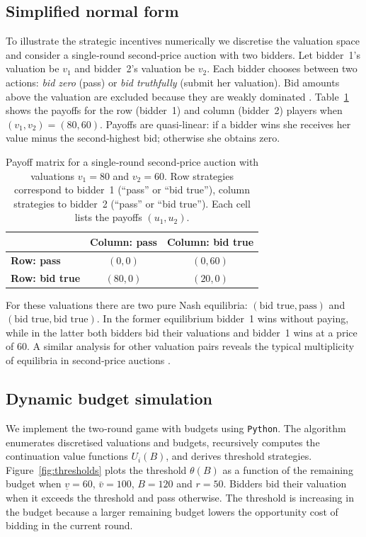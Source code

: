 \subsection{Simplified normal form}
To illustrate the strategic incentives numerically we discretise the valuation space and consider a single‑round second‑price auction with two bidders.  Let bidder~1’s valuation be \(v_1\) and bidder~2’s valuation be \(v_2\).  Each bidder chooses between two actions: \emph{bid zero} (pass) or \emph{bid truthfully} (submit her valuation).  Bid amounts above the valuation are excluded because they are weakly dominated \parencite{SpirakisAuctionsSlides}.  Table~\ref{tab:payoffmatrix} shows the payoffs for the row (bidder~1) and column (bidder~2) players when \((v_1,v_2)=(80,60)\).  Payoffs are quasi‑linear: if a bidder wins she receives her value minus the second‑highest bid; otherwise she obtains zero.

\begin{table}[H]
    \centering
    \caption{Payoff matrix for a single‑round second‑price auction with valuations \(v_1=80\) and \(v_2=60\).  Row strategies correspond to bidder~1 (“pass” or “bid true”), column strategies to bidder~2 (“pass” or “bid true”).  Each cell lists the payoffs \((u_1,u_2)\).}
    \label{tab:payoffmatrix}
    \begin{tabular}{lcc}
        \toprule
        & \textbf{Column: pass} & \textbf{Column: bid true}\\
        \midrule
        \textbf{Row: pass} & \((0,0)\) & \((0,60)\)\\
        \textbf{Row: bid true} & \((80,0)\) & \((20,0)\)\\
        \bottomrule
    \end{tabular}
\end{table}

For these valuations there are two pure Nash equilibria: \((\text{bid true},\text{pass})\) and \((\text{bid true},\text{bid true})\).  In the former equilibrium bidder~1 wins without paying, while in the latter both bidders bid their valuations and bidder~1 wins at a price of 60.  A similar analysis for other valuation pairs reveals the typical multiplicity of equilibria in second‑price auctions \parencite{SpirakisAuctionsSlides}.

\subsection{Dynamic budget simulation}
We implement the two‑round game with budgets using \texttt{Python}.  The algorithm enumerates discretised valuations and budgets, recursively computes the continuation value functions \(U_i(B)\), and derives threshold strategies.  Figure~\ref{fig:thresholds} plots the threshold \(\theta(B)\) as a function of the remaining budget when \(\underline{v}=60\), \(\bar{v}=100\), \(B=120\) and \(r=50\).  Bidders bid their valuation when it exceeds the threshold and pass otherwise.  The threshold is increasing in the budget because a larger remaining budget lowers the opportunity cost of bidding in the current round.

